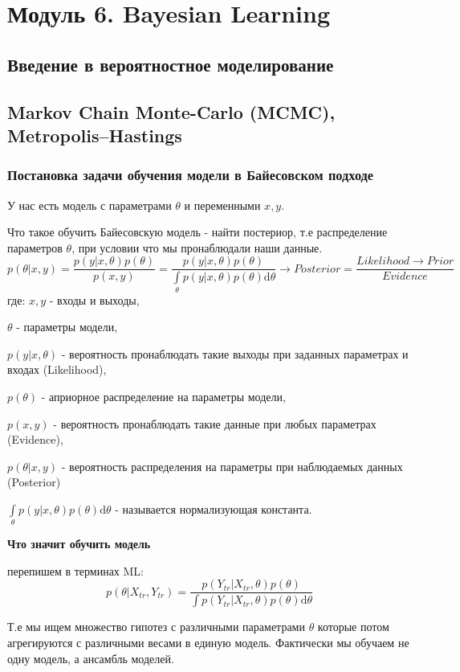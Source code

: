 \chapter{Модуль 6. Bayesian Learning}
\section{Введение в вероятностное моделирование}
\section{Markov Chain Monte-Carlo (MCMC), Metropolis–Hastings}
\subsection{Постановка задачи обучения модели в Байесовском подходе}
У нас есть модель с параметрами $\theta$ и переменными $x, y$. 

Что такое обучить Байесовскую модель - найти постериор, т.е распределение параметров $\theta$, при условии что мы пронаблюдали наши данные.
$$p(\theta|x, y) = \frac{p(y|x, \theta)p(\theta)}{p(x, y)} = \frac{p(y|x, \theta)p(\theta)}{\int\limits_{\theta}p(y|x, \theta)p(\theta)\mathrm d \theta} \to Posterior = \frac{Likelihood \to Prior}{Evidence}$$ 
где: $x, y$ - входы и выходы,

$\theta$ - параметры модели,

$p(y|x, \theta)$ - вероятность пронаблюдать такие выходы при заданных параметрах и входах (Likelihood), 

$p(\theta)$ - априорное распределение на параметры модели, 

$p(x, y)$ - вероятность пронаблюдать такие данные при любых параметрах (Evidence), 

$p(\theta|x, y)$ - вероятность распределения на параметры при наблюдаемых данных (Posterior)

$\displaystyle \int\limits_{\theta}p(y|x, \theta)p(\theta)\mathrm d \theta$ - называется нормализующая константа.

\textbf{Что значит обучить модель}

перепишем в терминах ML:
$$p(\theta|X_{tr}, Y_{tr}) = \frac{p(Y_{tr}|X_{tr}, \theta)p(\theta)}{\int p(Y_{tr}|X_{tr}, \theta)p(\theta) \mathrm d \theta}$$

Т.е мы ищем множество гипотез с различными параметрами $\theta$ которые потом агрегируются с различными весами в единую модель. Фактически мы обучаем не одну модель, а ансамбль моделей.

